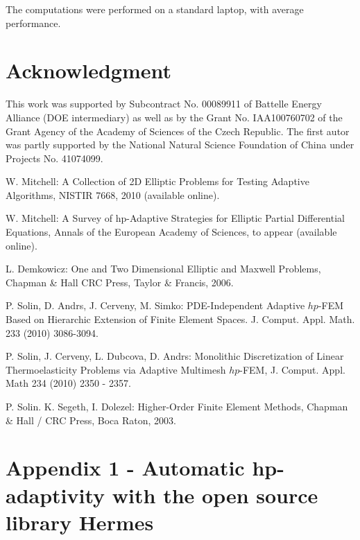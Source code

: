 \documentclass[12pt]{elsarticle}
\begin{document}
The computations were performed on a standard laptop, with average performance.

\section{Acknowledgment}

This work was supported by Subcontract No. 00089911 of Battelle
Energy Alliance (DOE intermediary) as well as by the
Grant No. IAA100760702 of the Grant Agency of the Academy
of Sciences of the Czech Republic. The first autor was partly
supported by the National Natural Science Foundation
of China under Projects No. 41074099.

\begin{thebibliography}{[KLR73]}

W. Mitchell: A Collection of 2D Elliptic Problems for
Testing Adaptive Algorithms, NISTIR 7668, 2010 (available online).

W. Mitchell: A Survey of hp-Adaptive Strategies for Elliptic Partial Differential Equations,
Annals of the European Academy of Sciences, to appear (available online).

L. Demkowicz: One and Two Dimensional Elliptic and Maxwell Problems,
Chapman \& Hall \/ CRC Press, Taylor \& Francis, 2006.


P. Solin, D. Andrs, J. Cerveny, M. Simko:
PDE-Independent Adaptive $hp$-FEM Based on Hierarchic Extension of Finite Element Spaces.
J. Comput. Appl. Math. 233 (2010) 3086-3094.

P. Solin, J. Cerveny, L. Dubcova, D. Andrs:
Monolithic Discretization of Linear Thermoelasticity Problems
via Adaptive Multimesh $hp$-FEM, J. Comput. Appl. Math 234 (2010) 2350 - 2357.

P. Solin. K. Segeth, I. Dolezel: Higher-Order Finite Element Methods, Chapman \& Hall
/ CRC Press, Boca Raton, 2003.
\end{thebibliography}

\newpage

\section{Appendix 1 - Automatic hp-adaptivity with the open source library Hermes}
\end{document}
